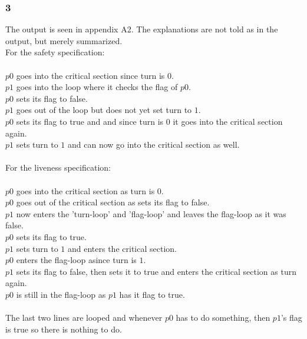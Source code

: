 \documentclass[12pt]{article}
\begin{document}
\subsubsection*{3}
The output is seen in appendix A2. The explanations are not told as in the output, but merely summarized.\\
For the safety specification:\\
\\
$p0$ goes into the critical section since turn is $0$.\\
$p1$ goes into the loop where it checks the flag of $p0$.\\
$p0$ sets its flag to false.\\
$p1$ goes out of the loop but does not yet set turn to $1$.\\
$p0$ sets its flag to true and and since turn is $0$ it goes into the critical section again.\\
$p1$ sets turn to $1$ and can now go into the critical section as well.\\
\\
For the liveness specification:\\
\\
$p0$ goes into the critical section as turn is $0$.\\
$p0$ goes out of the critical section as sets its flag to false.\\
$p1$ now enters the 'turn-loop' and 'flag-loop' and leaves the flag-loop as it was false.\\
$p0$ sets its flag to true.\\
$p1$ sets turn to $1$ and enters the critical section.\\
$p0$ enters the flag-loop asince turn is $1$.\\
$p1$ sets its flag to false, then sets it to true and enters the critical section as turn again.\\
$p0$ is still in the flag-loop as $p1$ has it flag to true.\\
\\
The last two lines are looped and whenever $p0$ has to do something, then $p1$'s flag is true so there is nothing to do.

\newpage
\end{document}
